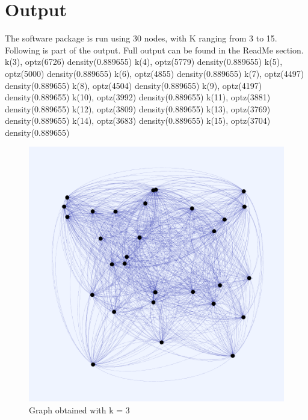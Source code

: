 \documentclass[11pt]{article}
\begin{document}
 \section{Output}
 The software package is run using 30 nodes, with K ranging from 3 to 15.
 Following is part of the output. Full output can be found in the ReadMe section.
 \linebreak
k(3), optz(6726) density(0.889655)\linebreak
k(4), optz(5779) density(0.889655) \linebreak
k(5), optz(5000) density(0.889655) \linebreak
k(6), optz(4855) density(0.889655) \linebreak
k(7), optz(4497) density(0.889655) \linebreak
k(8), optz(4504) density(0.889655) \linebreak
k(9), optz(4197) density(0.889655) \linebreak
k(10), optz(3992) density(0.889655) \linebreak
k(11), optz(3881) density(0.889655) \linebreak
k(12), optz(3809) density(0.889655) \linebreak
k(13), optz(3769) density(0.889655) \linebreak
k(14), optz(3683) density(0.889655) \linebreak
k(15), optz(3704) density(0.889655) \linebreak
\begin{figure}
\includegraphics[scale=0.2]{Graph_K3_PNG}
\caption{Graph obtained with k = 3}
\end{figure}
\end{document}
